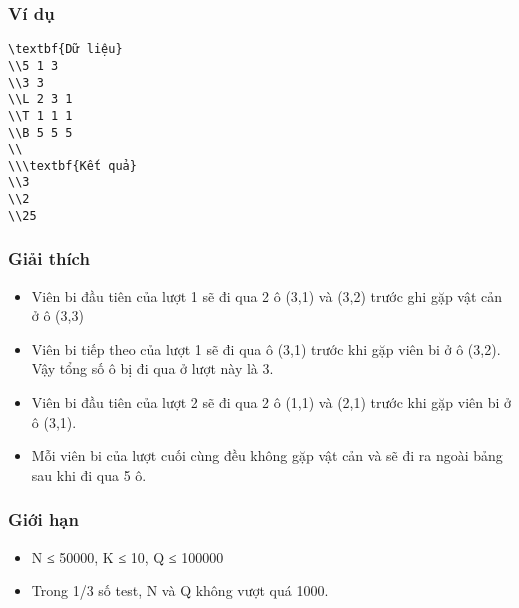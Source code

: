 \subsubsection{   Ví dụ  }
\begin{verbatim}
\textbf{Dữ liệu}
\\5 1 3
\\3 3
\\L 2 3 1
\\T 1 1 1
\\B 5 5 5
\\
\\\textbf{Kết quả}
\\3
\\2
\\25\end{verbatim}

\subsubsection{   Giải thích  }
\begin{itemize}
	\item     Viên bi đầu tiên của lượt 1 sẽ đi qua 2 ô (3,1) và (3,2) trước ghi gặp vật cản ở ô (3,3)   
	\item     Viên bi tiếp theo của lượt 1 sẽ đi qua ô (3,1) trước khi gặp viên bi ở ô (3,2). Vậy tổng số ô bị đi qua ở lượt này là 3.   
	\item     Viên bi đầu tiên của lượt 2 sẽ đi qua 2 ô (1,1) và (2,1) trước khi gặp viên bi ở ô (3,1).   
	\item     Mỗi viên bi của lượt cuối cùng đều không gặp vật cản và sẽ đi ra ngoài bảng sau khi đi qua 5 ô.   
\end{itemize}

\subsubsection{   Giới hạn  }
\begin{itemize}
	\item     N ≤ 50000, K ≤ 10, Q ≤ 100000   
	\item     Trong 1/3 số test, N và Q không vượt quá 1000.   
\end{itemize}

